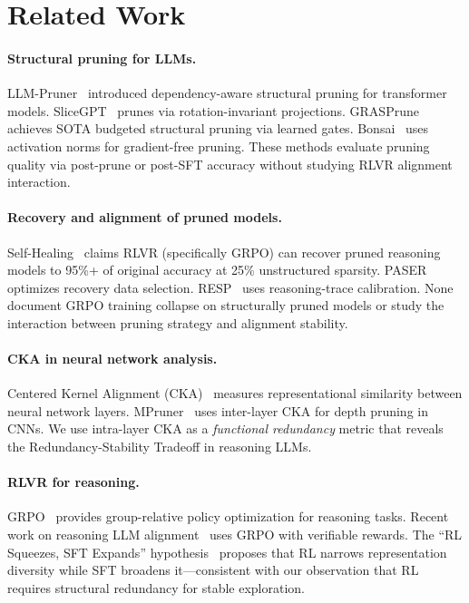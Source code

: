 \documentclass[11pt,a4paper]{article}
\begin{document}
\section{Related Work}

\paragraph{Structural pruning for LLMs.} LLM-Pruner~\cite{llmpruner-2023} introduced dependency-aware structural pruning for transformer models. SliceGPT~\cite{slicegpt-2024} prunes via rotation-invariant projections. GRASPrune~\cite{grasprune-2026} achieves SOTA budgeted structural pruning via learned gates. Bonsai~\cite{bonsai-2025} uses activation norms for gradient-free pruning. These methods evaluate pruning quality via post-prune or post-SFT accuracy without studying RLVR alignment interaction.

\paragraph{Recovery and alignment of pruned models.} Self-Healing~\cite{self-healing-2025} claims RLVR (specifically GRPO) can recover pruned reasoning models to 95\%+ of original accuracy at 25\% unstructured sparsity. PASER~\cite{paser-2025} optimizes recovery data selection. RESP~\cite{resp-2025} uses reasoning-trace calibration. None document GRPO training collapse on structurally pruned models or study the interaction between pruning strategy and alignment stability.

\paragraph{CKA in neural network analysis.} Centered Kernel Alignment (CKA)~\cite{cka-2019} measures representational similarity between neural network layers. MPruner~\cite{mpruner-2024} uses inter-layer CKA for depth pruning in CNNs. We use intra-layer CKA as a \emph{functional redundancy} metric that reveals the Redundancy-Stability Tradeoff in reasoning LLMs.

\paragraph{RLVR for reasoning.} GRPO~\cite{grpo-2024} provides group-relative policy optimization for reasoning tasks. Recent work on reasoning LLM alignment~\cite{deepseek-r1-2024} uses GRPO with verifiable rewards. The ``RL Squeezes, SFT Expands'' hypothesis~\cite{rl-squeezes-2026} proposes that RL narrows representation diversity while SFT broadens it---consistent with our observation that RL requires structural redundancy for stable exploration.
\end{document}
